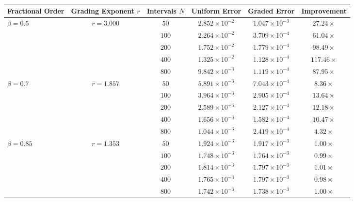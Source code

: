 \begin{tabular}{lccccc}
\toprule
\textbf{Fractional Order} & \textbf{Grading Exponent $r$} & \textbf{Intervals $N$} & \textbf{Uniform Error} & \textbf{Graded Error} & \textbf{Improvement} \\
\midrule
\multirow{5}{*}{$\beta = 0.5$} & \multirow{5}{*}{$r = 3.000$} & $50$ & $2.852 \times 10^{-2}$ & $1.047 \times 10^{-3}$ & $27.24\times$ \\
 &  & $100$ & $2.264 \times 10^{-2}$ & $3.709 \times 10^{-4}$ & $61.04\times$ \\
 &  & $200$ & $1.752 \times 10^{-2}$ & $1.779 \times 10^{-4}$ & $98.49\times$ \\
 &  & $400$ & $1.325 \times 10^{-2}$ & $1.128 \times 10^{-4}$ & $117.46\times$ \\
 &  & $800$ & $9.842 \times 10^{-3}$ & $1.119 \times 10^{-4}$ & $87.95\times$ \\
\midrule
\multirow{5}{*}{$\beta = 0.7$} & \multirow{5}{*}{$r = 1.857$} & $50$ & $5.891 \times 10^{-3}$ & $7.043 \times 10^{-4}$ & $8.36\times$ \\
 &  & $100$ & $3.964 \times 10^{-3}$ & $2.905 \times 10^{-4}$ & $13.64\times$ \\
 &  & $200$ & $2.589 \times 10^{-3}$ & $2.127 \times 10^{-4}$ & $12.18\times$ \\
 &  & $400$ & $1.656 \times 10^{-3}$ & $1.582 \times 10^{-4}$ & $10.47\times$ \\
 &  & $800$ & $1.044 \times 10^{-3}$ & $2.419 \times 10^{-4}$ & $4.32\times$ \\
\midrule
\multirow{5}{*}{$\beta = 0.85$} & \multirow{5}{*}{$r = 1.353$} & $50$ & $1.924 \times 10^{-3}$ & $1.917 \times 10^{-3}$ & $1.00\times$ \\
 &  & $100$ & $1.748 \times 10^{-3}$ & $1.764 \times 10^{-3}$ & $0.99\times$ \\
 &  & $200$ & $1.814 \times 10^{-3}$ & $1.797 \times 10^{-3}$ & $1.01\times$ \\
 &  & $400$ & $1.765 \times 10^{-3}$ & $1.797 \times 10^{-3}$ & $0.98\times$ \\
 &  & $800$ & $1.742 \times 10^{-3}$ & $1.738 \times 10^{-3}$ & $1.00\times$ \\
\bottomrule
\end{tabular}